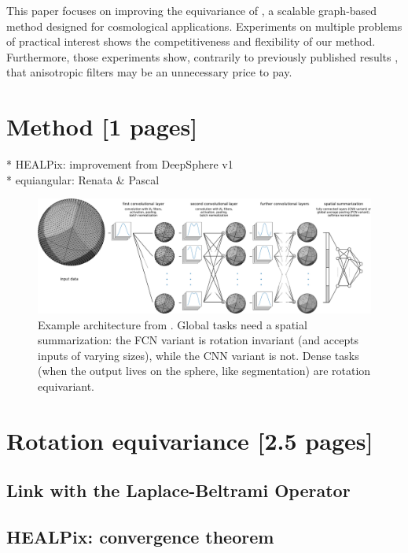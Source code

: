 \documentclass{article} %
\newcommand{\todo}[1]{{\color[rgb]{.6,.1,.6}{#1}}}
\begin{document}
This paper focuses on improving the equivariance of \cite{perraudin2019deepsphere}, a scalable graph-based method designed for cosmological applications.
\todo{cite RLGM paper}
Experiments on multiple problems of practical interest shows the competitiveness and flexibility of our method.
Furthermore, those experiments show, contrarily to previously published results \cite{cohen_gauge_2019}, that anisotropic filters may be an unnecessary price to pay.

\section{Method [1 pages]}

* HEALPix: improvement from DeepSphere v1 \cite{perraudin2019deepsphere} \\
* equiangular: Renata \& Pascal \\

\begin{figure}
	\centering
	\includegraphics[width=0.9\linewidth]{figure_architecture_v3}
	\caption{Example architecture from \cite{perraudin2019deepsphere}.
		Global tasks need a spatial summarization: the FCN variant is rotation invariant (and accepts inputs of varying sizes), while the CNN variant is not.
		Dense tasks (when the output lives on the sphere, like segmentation) are rotation equivariant.
	}
	\label{fig:architecture}
\end{figure}

\section{Rotation equivariance [2.5 pages]}

\subsection{Link with the Laplace-Beltrami Operator}

\subsection{HEALPix: convergence theorem}
\end{document}
